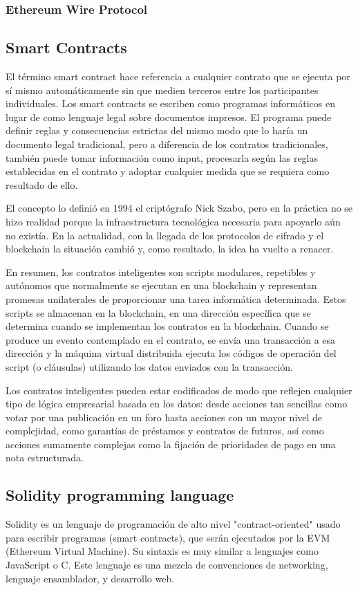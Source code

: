 \subsubsection{Ethereum Wire Protocol}

\subsection{Smart Contracts}
El término smart contract hace referencia a cualquier contrato que se ejecuta por sí mismo
automáticamente sin que medien terceros entre los participantes individuales. Los smart contracts
se escriben como programas informáticos en lugar de como lenguaje legal sobre documentos impresos.
El programa puede definir reglas y consecuencias estrictas del mismo modo que lo haría un documento
legal tradicional, pero a diferencia de los contratos tradicionales, también puede tomar
información como input, procesarla según las reglas establecidas en el contrato y adoptar cualquier
medida que se requiera como resultado de ello.

El concepto lo definió en 1994 el criptógrafo Nick Szabo, pero en la práctica no se hizo realidad
porque la infraestructura tecnológica necesaria para apoyarlo aún no existía. En la actualidad, con
la llegada de los protocolos de cifrado y el blockchain la situación cambió y, como resultado, la
idea ha vuelto a renacer.

En resumen, los contratos inteligentes son scripts modulares, repetibles y autónomos que
normalmente se ejecutan en una blockchain y representan promesas unilaterales de proporcionar una
tarea informática determinada. Estos scripts se almacenan en la blockchain, en una dirección
específica que se determina cuando se implementan los contratos en la blockchain. Cuando se produce
un evento contemplado en el contrato, se envía una transacción a esa dirección y la máquina virtual
distribuida ejecuta los códigos de operación del script (o cláusulas) utilizando los datos enviados
con la transacción.

Los contratos inteligentes pueden estar codificados de modo que reflejen cualquier tipo de lógica
empresarial basada en los datos: desde acciones tan sencillas como votar por una publicación en un
foro hasta acciones con un mayor nivel de complejidad, como garantías de préstamos y contratos de
futuros, así como acciones sumamente complejas como la fijación de prioridades de pago en una nota
estructurada.


\subsection{Solidity programming language}
Solidity es un lenguaje de programación de alto nivel "contract-oriented" usado para escribir
programas (smart contracts), que serán ejecutados por la EVM (Ethereum Virtual Machine). Su
sintaxis es muy similar a lenguajes como JavaScript o C.
Este lenguaje es una mezcla de convenciones de networking, lenguaje ensamblador, y desarrollo web.

